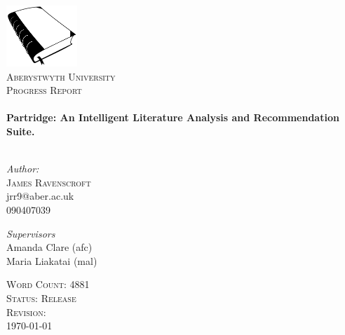 \begin{titlepage}
 
\begin{center}

\includegraphics[width=0.20\textwidth]{../cover_logo.png}\\[1cm]
 
\textsc{\LARGE Aberystwyth University}\\[1.5cm]
 
\textsc{\LARGE Progress Report}\\[0.5cm]
 
 
\HRule \\[0.4cm]
{ \huge \bfseries Partridge: An Intelligent Literature Analysis and
Recommendation Suite.}\\[0.4cm]

\HRule \\[1.5cm]

\begin{minipage}{0.4\textwidth}
\begin{flushleft} \large
\emph{Author:}\\
\textsc{James Ravenscroft}\\
jrr9@aber.ac.uk\\
090407039 
\end{flushleft}
\end{minipage}
\begin{minipage}{0.4\textwidth}
\begin{flushright} \large
\emph{Supervisors} \\
Amanda Clare (afc)\\
Maria Liakatai (mal)

\end{flushright}
\end{minipage}

\vfill
 
\textsc{\large Word Count: 4881}\\
\textsc{\large Status: Release}\\
\textsc{\large Revision: \Revision{} }\\
{\large \today}
 
\end{center}
 
\end{titlepage}

